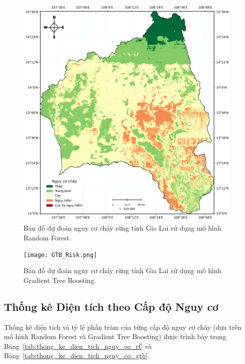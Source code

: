 \documentclass{article}
\begin{document}
\begin{figure}[H]
\centering
\includegraphics[width=1\textwidth]{RF_Risk.png}
\caption{Bản đồ dự đoán nguy cơ cháy rừng tỉnh Gia Lai sử dụng mô hình Random Forest.}
\label{fig:ban_do_nguy_co_rf}
\end{figure}

\begin{figure}[H]
\centering
\texttt{[image: GTB\_Risk.png]}
\caption{Bản đồ dự đoán nguy cơ cháy rừng tỉnh Gia Lai sử dụng mô hình Gradient Tree Boosting.}
\label{fig:ban_do_nguy_co_gtb}
\end{figure}

\subsection{Thống kê Diện tích theo Cấp độ Nguy cơ} %
Thống kê diện tích và tỷ lệ phần trăm của từng cấp độ nguy cơ cháy (dựa trên mô hình Random Forest và Gradient Tree Boosting) được trình bày trong Bảng~\ref{tab:thong_ke_dien_tich_nguy_co_rf} và Bảng~\ref{tab:thong_ke_dien_tich_nguy_co_gtb}.
\end{document}
